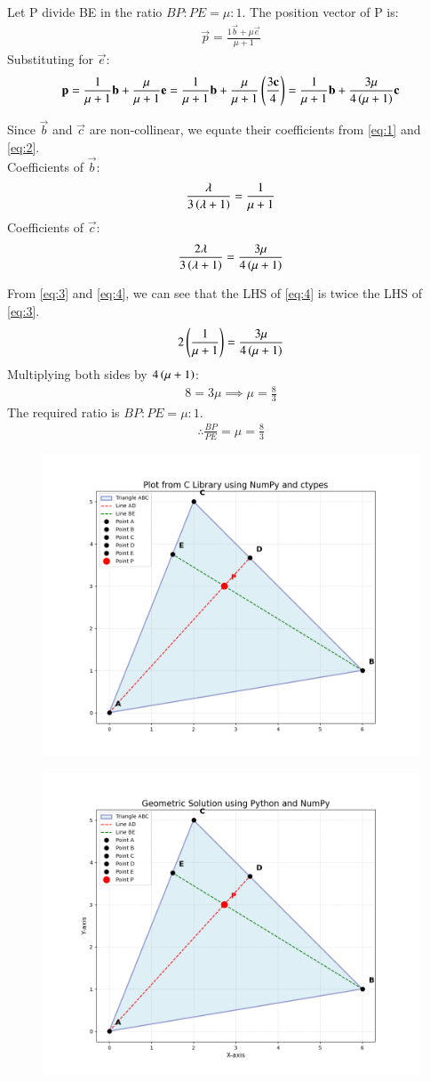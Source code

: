 \documentclass[journal]{IEEEtran}
\begin{document}
	Let P divide BE in the ratio $BP:PE = \mu:1$. The position vector of P is:
	\begin{align}
		\vec{p} = \frac{1\vec{b} + \mu\vec{e}}{\mu+1}
	\end{align}
	Substituting for $\vec{e}$:
	\begin{align}
		\mathbf{p} = \frac{1}{\mu+1}\mathbf{b} + \frac{\mu}{\mu+1} \mathbf{e} = \frac{1}{\mu+1}\mathbf{b} + \frac{\mu}{\mu+1} \left( \frac{3\mathbf{c}}{4} \right) = \frac{1}{\mu+1}\mathbf{b} + \frac{3\mu}{4\left(\mu+1\right)}\mathbf{c} \label{eq:2}
	\end{align}
	
	Since $\vec{b}$ and $\vec{c}$ are non-collinear, we equate their coefficients from \eqref{eq:1} and \eqref{eq:2}.\\
	Coefficients of $\vec{b}$:
	\begin{align}
		\frac{\lambda}{3\left(\lambda+1\right)} = \frac{1}{\mu+1} \label{eq:3}
	\end{align}
	Coefficients of $\vec{c}$:
	\begin{align}
		\frac{2\lambda}{3\left(\lambda+1\right)} = \frac{3\mu}{4\left(\mu+1\right)} \label{eq:4}
	\end{align}
	
	From \eqref{eq:3} and \eqref{eq:4}, we can see that the LHS of \eqref{eq:4} is twice the LHS of \eqref{eq:3}.
	\begin{align}
		2 \left(\frac{1}{\mu+1}\right) = \frac{3\mu}{4\left(\mu+1\right)}
	\end{align}
	Multiplying both sides by $4\left(\mu+1\right)$:
	\begin{align}
		8 = 3\mu \implies \mu = \frac{8}{3}
	\end{align}
	The required ratio is $BP:PE = \mu:1$.
	\begin{align}
		\therefore	\frac{BP}{PE} = \mu = \frac{8}{3}
	\end{align}
	
	\begin{figure}[H]
		\centering
		\includegraphics[width = 0.5\columnwidth]{Figure_1.png}
		\caption*{}
		\label{fig1}
	\end{figure}
		\begin{figure}[H]
		\centering
		\includegraphics[width = 0.5\columnwidth]{Figure_2.png}
		\caption*{}
		\label{fig2}
	\end{figure}
	
\end{document}
